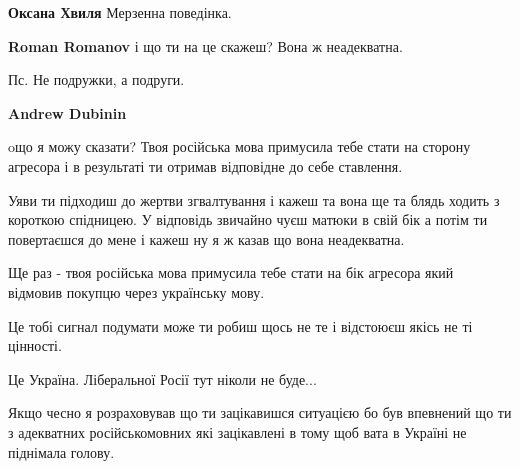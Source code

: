 \begin{itemize}
\begin{itemize}
 
\textbf{Оксана Хвиля} Мерзенна поведінка.

 
\textbf{Roman Romanov} і що ти на це скажеш? Вона ж неадекватна.

 
Пс.
Не подружки, а подруги.

 
\textbf{Andrew Dubinin} 

oщо я можу сказати? Твоя російська мова примусила тебе стати на сторону агресора і в результаті ти отримав відповідне до себе ставлення.

Уяви ти підходиш до жертви згвалтування і кажеш та вона ще та блядь ходить з короткою спідницею. У відповідь звичайно чуєш матюки в свій бік а потім ти повертаєшся до мене і кажеш ну я ж казав що вона неадекватна.

Ще раз - твоя російська мова примусила тебе стати на бік агресора який відмовив покупцю через українську мову.

Це тобі сигнал подумати може ти робиш щось не те і відстоюєш якісь не ті цінності.

Це Україна. Ліберальної Росії тут ніколи не буде...

Якщо чесно я розраховував що ти зацікавишся ситуацією бо був впевнений що ти з
адекватних російськомовних які зацікавлені в тому щоб вата в Україні не
піднімала голову.

 

\end{itemize}
\end{itemize}
